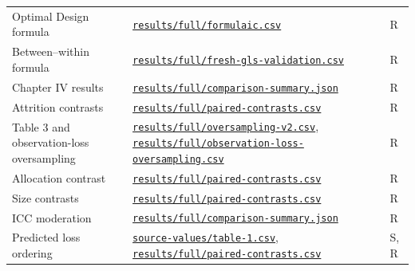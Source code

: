 \begin{longtable}{@{}L{.28\linewidth}L{.60\linewidth}l@{}}
Optimal Design formula & \href{https://github.com/alectionary/vibe-math/blob/master/formalization/kupzyk-power-assumptions/results/full/formulaic.csv}{\nolinkurl{results/full/formulaic.csv}} & R \\
Between--within formula & \href{https://github.com/alectionary/vibe-math/blob/master/formalization/kupzyk-power-assumptions/results/full/fresh-gls-validation.csv}{\nolinkurl{results/full/fresh-gls-validation.csv}} & R \\
Chapter IV results & \href{https://github.com/alectionary/vibe-math/blob/master/formalization/kupzyk-power-assumptions/results/full/comparison-summary.json}{\nolinkurl{results/full/comparison-summary.json}} & R \\
Attrition contrasts & \href{https://github.com/alectionary/vibe-math/blob/master/formalization/kupzyk-power-assumptions/results/full/paired-contrasts.csv}{\nolinkurl{results/full/paired-contrasts.csv}} & R \\
Table 3 and observation-loss oversampling & \href{https://github.com/alectionary/vibe-math/blob/master/formalization/kupzyk-power-assumptions/results/full/oversampling-v2.csv}{\nolinkurl{results/full/oversampling-v2.csv}}, \href{https://github.com/alectionary/vibe-math/blob/master/formalization/kupzyk-power-assumptions/results/full/observation-loss-oversampling.csv}{\nolinkurl{results/full/observation-loss-oversampling.csv}} & R \\
Allocation contrast & \href{https://github.com/alectionary/vibe-math/blob/master/formalization/kupzyk-power-assumptions/results/full/paired-contrasts.csv}{\nolinkurl{results/full/paired-contrasts.csv}} & R \\
Size contrasts & \href{https://github.com/alectionary/vibe-math/blob/master/formalization/kupzyk-power-assumptions/results/full/paired-contrasts.csv}{\nolinkurl{results/full/paired-contrasts.csv}} & R \\
ICC moderation & \href{https://github.com/alectionary/vibe-math/blob/master/formalization/kupzyk-power-assumptions/results/full/comparison-summary.json}{\nolinkurl{results/full/comparison-summary.json}} & R \\
Predicted loss ordering & \href{https://github.com/alectionary/vibe-math/blob/master/formalization/kupzyk-power-assumptions/source-values/table-1.csv}{\nolinkurl{source-values/table-1.csv}}, \href{https://github.com/alectionary/vibe-math/blob/master/formalization/kupzyk-power-assumptions/results/full/paired-contrasts.csv}{\nolinkurl{results/full/paired-contrasts.csv}} & S, R \\

\end{longtable}
